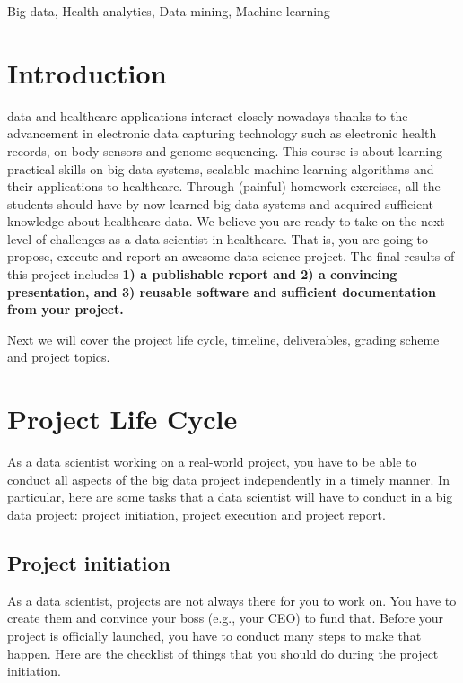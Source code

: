 \documentclass[journal]{IEEEtran}
\begin{document}
\begin{IEEEkeywords}
Big data, Health analytics, Data mining, Machine learning
\end{IEEEkeywords}
%
\IEEEpeerreviewmaketitle



\section{Introduction}
 data and healthcare applications interact closely nowadays thanks to the advancement in electronic data capturing technology such as electronic health records, on-body sensors and genome sequencing. This course is about learning practical skills on big data systems, scalable machine learning algorithms and their applications to healthcare. Through (painful) homework exercises, all the students should have by now learned big data systems and acquired sufficient knowledge about healthcare data. We believe you are ready to take on the next level of challenges as a data scientist in healthcare. That is, you are going to propose, execute and report an awesome data science project. The final results of this project includes \textbf{ 1) a publishable report and 2) a convincing presentation, and 3) reusable software and sufficient documentation from your project.} 

Next we will cover the project life cycle, timeline, deliverables, grading scheme and project topics. 

\section{Project Life Cycle}
As a data scientist working on a real-world project, you have to be able to conduct all aspects of the big data project independently in a timely manner. In particular, here are some tasks that a data scientist will have to conduct in a big data project: project initiation, project execution and project report. 


\subsection{Project initiation}
As a data scientist, projects are not always there for you to work on. You have to create them and convince your boss (e.g., your CEO) to fund that. 
Before your project is officially launched, you have to conduct many steps to make that happen. 
Here are the checklist of things that you should do during the project initiation. 
\end{document}

